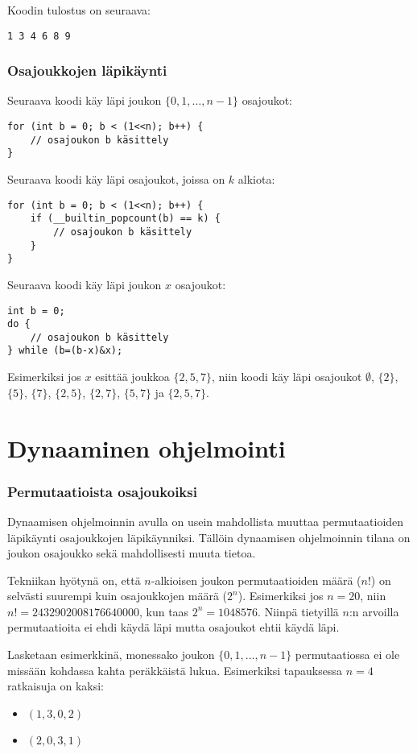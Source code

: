 Koodin tulostus on seuraava:
\begin{lstlisting}
1 3 4 6 8 9
\end{lstlisting}

\subsubsection{Osajoukkojen läpikäynti}

Seuraava koodi käy läpi joukon $\{0,1,\ldots,n-1\}$ osajoukot:

\begin{lstlisting}
for (int b = 0; b < (1<<n); b++) {
    // osajoukon b käsittely
}
\end{lstlisting}
Seuraava koodi käy läpi
osajoukot, joissa on $k$ alkiota:
\begin{lstlisting}
for (int b = 0; b < (1<<n); b++) {
    if (__builtin_popcount(b) == k) {
        // osajoukon b käsittely
    }
}
\end{lstlisting}
Seuraava koodi käy läpi joukon $x$ osajoukot:
\begin{lstlisting}
int b = 0;
do {
    // osajoukon b käsittely
} while (b=(b-x)&x);
\end{lstlisting}
Esimerkiksi jos $x$ esittää joukkoa $\{2,5,7\}$,
niin koodi käy läpi osajoukot
$\emptyset$, $\{2\}$, $\{5\}$, $\{7\}$,
$\{2,5\}$, $\{2,7\}$, $\{5,7\}$ ja $\{2,5,7\}$.

\section{Dynaaminen ohjelmointi}

\subsubsection{Permutaatioista osajoukoiksi}

Dynaamisen ohjelmoinnin avulla on usein mahdollista
muuttaa permutaatioiden läpikäynti osajoukkojen läpikäynniksi.
Tällöin dynaamisen ohjelmoinnin tilana on
joukon osajoukko sekä mahdollisesti muuta tietoa.

Tekniikan hyötynä on,
että $n$-alkioisen joukon permutaatioiden määrä ($n!$)
on selvästi suurempi kuin osajoukkojen määrä ($2^n$).
Esimerkiksi jos $n=20$, niin $n!=2432902008176640000$,
kun taas $2^n=1048576$.
Niinpä tietyillä $n$:n arvoilla permutaatioita ei ehdi
käydä läpi mutta osajoukot ehtii käydä läpi.

Lasketaan esimerkkinä, monessako
joukon $\{0,1,\ldots,n-1\}$
permutaatiossa ei ole 
missään kohdassa kahta peräkkäistä lukua.
Esimerkiksi tapauksessa $n=4$ ratkaisuja on kaksi:
\begin{itemize}
\item $(1,3,0,2)$
\item $(2,0,3,1)$
\end{itemize}

